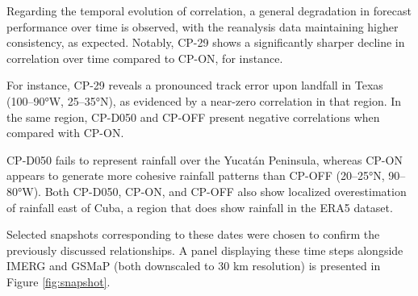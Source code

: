 Regarding the temporal evolution of correlation, a general degradation in forecast performance over time is observed, with the reanalysis data maintaining higher consistency, as expected. Notably, CP-29 shows a significantly sharper decline in correlation over time compared to CP-ON, for instance. 

For instance, CP-29 reveals a pronounced track error upon landfall in Texas (100–90°W, 25–35°N), as evidenced by a near-zero correlation in that region. In the same region, CP-D050 and CP-OFF present negative correlations when compared with CP-ON.

CP-D050 fails to represent rainfall over the Yucatán Peninsula, whereas CP-ON appears to generate more cohesive rainfall patterns than CP-OFF (20–25°N, 90–80°W). Both CP-D050, CP-ON, and CP-OFF also show localized overestimation of rainfall east of Cuba, a region that does show rainfall in the ERA5 dataset.

Selected snapshots corresponding to these dates were chosen to confirm the previously discussed relationships. A panel displaying these time steps alongside IMERG and GSMaP (both downscaled to 30 km resolution) is presented in Figure \ref{fig:snapshot}.


